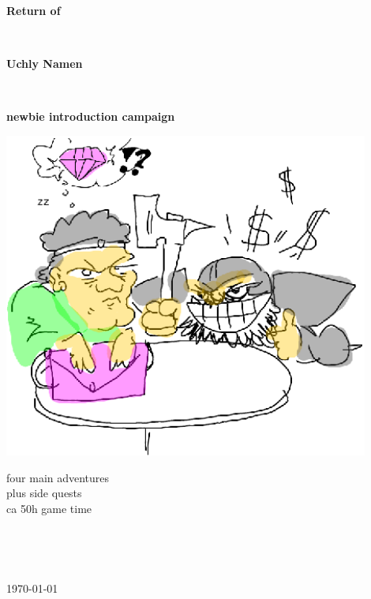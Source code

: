 \documentclass[11pt, twoside, titlepage, a4paper]{report}
\begin{document}

\begin{titlepage}

\begin{center}

   \vspace{4 cm} %

   \textbf{\Huge{Return of}}

   \ %

   \textbf{\Huge{Uchly Namen}}

   \ %

   \textbf{\Large{newbie introduction campaign}}

   \vspace{2 cm} %
   \includegraphics[width=120mm]{./figs/negotiate.eps}

   \vspace{2 cm} %

   \normalsize
   four main adventures\\
   plus side quests\\
   ca 50h game time


   \vfill %


   \ %



   \ %

   \normalsize{\today}

\end{center}


\end{titlepage}
\end{document}
